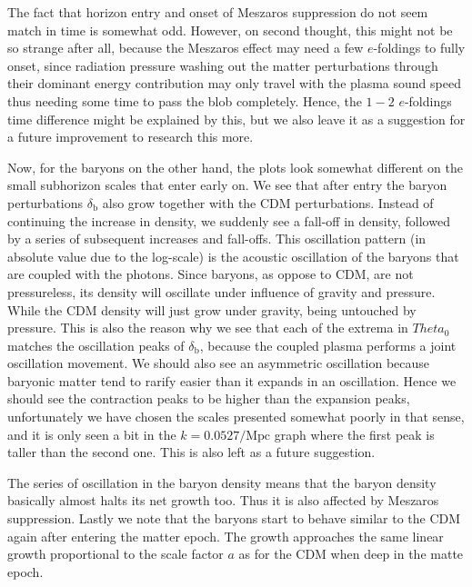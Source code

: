 \documentclass[twocolumn]{aastex62}
\begin{document}
The fact that horizon entry and onset of Meszaros suppression do not seem match in time is somewhat odd. However, on second thought, this might not be so strange after all, because the Meszaros effect may need a few $e$-foldings to fully onset, since radiation pressure washing out the matter perturbations through their dominant energy contribution may only travel with the plasma sound speed thus needing some time to pass the blob completely. Hence, the $1-2$ $e$-foldings time difference might be explained by this, but we also leave it as a suggestion for a future improvement to research this more.   

Now, for the baryons on the other hand, the plots look somewhat different on the small subhorizon scales that enter early on. We see that after entry the baryon perturbations $\delta_\text{b}$ also grow together with the CDM perturbations. Instead of continuing the increase in density, we suddenly see a fall-off in density, followed by a series of subsequent increases and fall-offs. This oscillation pattern (in absolute value due to the log-scale) is the acoustic oscillation of the baryons that are coupled with the photons. Since baryons, as oppose to CDM, are not pressureless, its density will oscillate under influence of gravity and pressure. While the CDM density will just grow under gravity, being untouched by pressure. This is also the reason why we see that each of the extrema in $Theta_0$ matches the oscillation peaks of $\delta_\text{b}$, because the coupled plasma performs a joint oscillation movement. We should also see an asymmetric oscillation because baryonic matter tend to rarify easier than it expands in an oscillation. Hence we should see the contraction peaks to be higher than the expansion peaks, unfortunately we have chosen the scales presented somewhat poorly in that sense, and it is only seen a bit in the $k = 0.0527/\mathrm{Mpc}$ graph where the first peak is taller than the second one. This is also left as a future suggestion. 

The series of oscillation in the baryon density means that the baryon density basically almost halts its net growth too. Thus it is also affected by Meszaros suppression. Lastly we note that the baryons start to behave similar to the CDM again after entering the matter epoch. The growth approaches the same linear growth proportional to the scale factor $a$ as for the CDM when deep in the matte epoch. 
\end{document}

